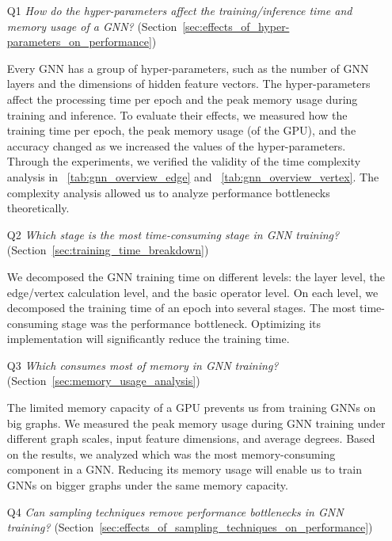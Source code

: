\begin{itemize}

    \item[Q1] \emph{How do the hyper-parameters affect the training/inference time and memory usage of a GNN?} (Section~\ref{sec:effects_of_hyper-parameters_on_performance})

          Every GNN has a group of hyper-parameters, such as the number of GNN layers and the dimensions of hidden feature vectors.
          The hyper-parameters affect the processing time per epoch and the peak memory usage during training and inference.
          To evaluate their effects, we measured how the training time per epoch, the peak memory usage (of the GPU), and the accuracy changed as we increased the values of the hyper-parameters.
          Through the experiments, we verified the validity of the time complexity analysis in \tablename~\ref{tab:gnn_overview_edge} and \tablename~\ref{tab:gnn_overview_vertex}.
          The complexity analysis allowed us to analyze performance bottlenecks theoretically.

    \item[Q2] \emph{Which stage is the most time-consuming stage in GNN training?} (Section~\ref{sec:training_time_breakdown})

          We decomposed the GNN training time on different levels: the layer level, the edge/vertex calculation level, and the basic operator level.
          On each level, we decomposed the training time of an epoch into several stages.
          The most time-consuming stage was the performance bottleneck.
          Optimizing its implementation will significantly reduce the training time.

    \item[Q3] \emph{Which consumes most of memory in GNN training?} (Section~\ref{sec:memory_usage_analysis})

          The limited memory capacity of a GPU prevents us from training GNNs on big graphs.
          We measured the peak memory usage during GNN training under different graph scales, input feature dimensions, and average degrees.
          Based on the results, we analyzed which was the most memory-consuming component in a GNN.
          Reducing its memory usage will enable us to train GNNs on bigger graphs under the same memory capacity.

    \item[Q4] \emph{Can sampling techniques remove performance bottlenecks in GNN training?} (Section~\ref{sec:effects_of_sampling_techniques_on_performance})


\end{itemize}
